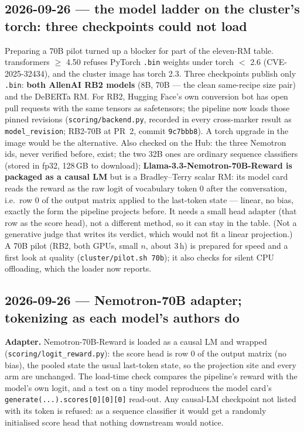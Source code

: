 \documentclass{article}
\begin{document}
\subsection*{2026-09-26 --- the model ladder on the cluster's torch: three checkpoints could not load}
Preparing a 70B pilot turned up a blocker for part of the eleven-RM table. transformers $\ge$ 4.50 refuses PyTorch
\texttt{.bin} weights under torch $<$ 2.6 (CVE-2025-32434), and the cluster image has torch 2.3. Three checkpoints
publish only \texttt{.bin}: \textbf{both AllenAI RB2 models} (8B, 70B --- the clean same-recipe size pair) and the
DeBERTa RM. For RB2, Hugging Face's own conversion bot has open pull requests with the same tensors as safetensors;
the pipeline now loads those pinned revisions (\texttt{scoring/backend.py}, recorded in every cross-marker result
as \texttt{model\_revision}; RB2-70B at PR~2, commit \texttt{9c7bbb8}). A torch upgrade in the image would be the
alternative. Also checked on the Hub: the three Nemotron ids, never verified before, exist; the two 32B ones are
ordinary sequence classifiers (stored in fp32, 128\,GB to download); \textbf{Llama-3.3-Nemotron-70B-Reward is packaged as a causal
LM} but is a Bradley--Terry scalar RM: its model card reads the reward as the raw logit of vocabulary token 0 after the
conversation, i.e.\ row 0 of the output matrix applied to the last-token state --- linear, no bias, exactly the form the
pipeline projects before. It needs a small head adapter (that row as the score head), not a different method, so it
can stay in the table. (Not a generative judge that writes its verdict, which would not fit a linear projection.) A 70B pilot (RB2, both GPUs, small $n$, about 3\,h) is prepared for speed and a
first look at quality (\texttt{cluster/pilot.sh 70b}); it also checks for silent CPU offloading, which the loader
now reports.

\subsection*{2026-09-26 --- Nemotron-70B adapter; tokenizing as each model's authors do}
\textbf{Adapter.} Nemotron-70B-Reward is loaded as a causal LM and wrapped (\texttt{scoring/logit\_reward.py}): the
score head is row 0 of the output matrix (no bias), the pooled state the usual last-token state, so the projection
site and every arm are unchanged. The load-time check compares the pipeline's reward with the model's own logit, and a
test on a tiny model reproduces the model card's \texttt{generate(...).scores[0][0][0]} read-out. Any causal-LM
checkpoint not listed with its token is refused: as a sequence classifier it would get a randomly initialised score
head that nothing downstream would notice.
\end{document}
